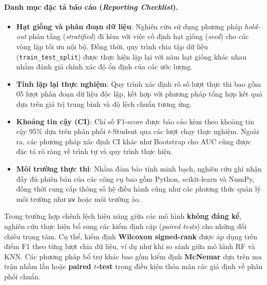 \documentclass[14pt,a4paper]{extreport}
\begin{document}
\paragraph{Danh mục đặc tả báo cáo (\textit{Reporting Checklist}).}
\begin{itemize}
  \item \textbf{Hạt giống và phân đoạn dữ liệu}: Nghiên cứu sử dụng phương pháp \textit{hold-out} phân tầng (\textit{stratified}) đi kèm với việc cố định hạt giống (\textit{seed}) cho các vòng lặp tối ưu nội bộ. Đồng thời, quy trình chia tập dữ liệu (\texttt{train\_test\_split}) được thực hiện lặp lại với năm hạt giống khác nhau nhằm đánh giá chính xác độ ổn định của các ước lượng.
  \item \textbf{Tính lặp lại thực nghiệm}: Quy trình xác định rõ số lượt thực thi bao gồm 05 lượt phân đoạn dữ liệu độc lập, kết hợp với phương pháp tổng hợp kết quả dựa trên giá trị trung bình và độ lệch chuẩn tương ứng.
  \item \textbf{Khoảng tin cậy (CI)}: Chỉ số F1-score được báo cáo kèm theo khoảng tin cậy 95\% dựa trên phân phối $t$-Student qua các lượt chạy thực nghiệm. Ngoài ra, các phương pháp xác định CI khác như Bootstrap cho AUC cũng được đặc tả rõ ràng về trình tự và quy trình thực hiện.
  \item \textbf{Môi trường thực thi}: Nhằm đảm bảo tính minh bạch, nghiên cứu ghi nhận đầy đủ phiên bản của các công cụ bao gồm Python, scikit-learn và NumPy, đồng thời cung cấp thông số hệ điều hành cũng như các phương thức quản lý môi trường như \texttt{uv} hoặc môi trường ảo.
\end{itemize}

Trong trường hợp chênh lệch hiệu năng giữa các mô hình \textbf{không đáng kể}, nghiên cứu thực hiện bổ sung các kiểm định cặp (\textit{paired tests}) cho những đối chiếu trọng tâm. Cụ thể, kiểm định \textbf{Wilcoxon signed-rank} được áp dụng trên điểm F1 theo từng lượt chia dữ liệu, ví dụ như khi so sánh giữa mô hình RF và KNN. Các phương pháp bổ trợ khác bao gồm kiểm định \textbf{McNemar} dựa trên ma trận nhầm lẫn hoặc \textbf{paired $t$-test} trong điều kiện thỏa mãn các giả định về phân phối chuẩn.
\end{document}
